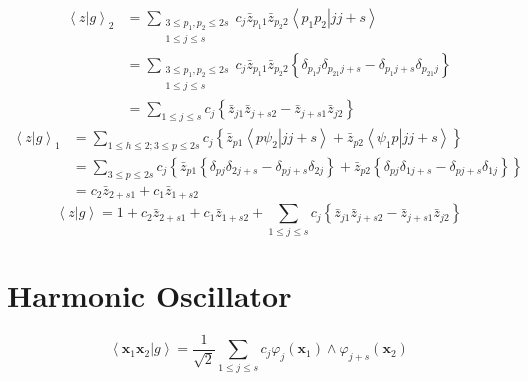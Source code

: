 \documentclass[aps,preprint]{revtex4}%
\begin{document}
\begin{align}
\left\langle \left.  z\right\vert g\right\rangle _{2} &  =%
{\displaystyle\sum\limits_{\substack{3\leq p_{1},p_{2}\leq2s\\1\leq j\leq s}}}
c_{j}\bar{z}_{p_{1}1}\bar{z}_{p_{2}2}\left\langle \left.  p_{1}p_{2}%
\right\vert jj+s\right\rangle \\
&  =%
{\displaystyle\sum\limits_{\substack{3\leq p_{1},p_{2}\leq2s\\1\leq j\leq s}}}
c_{j}\bar{z}_{p_{1}1}\bar{z}_{p_{2}2}\left\{  \delta_{p_{1}j}\delta
_{p_{21}j+s}-\delta_{p_{1}j+s}\delta_{p_{21}j}\right\}  \\
&  =%
{\displaystyle\sum\limits_{1\leq j\leq s}}
c_{j}\left\{  \bar{z}_{j1}\bar{z}_{j+s2}-\bar{z}_{j+s1}\bar{z}_{j2}\right\}
\end{align}%
\begin{align}
\left\langle \left.  z\right\vert g\right\rangle _{1}  & =%
{\displaystyle\sum\limits_{1\leq h\leq2;3\leq p\leq2s}}
c_{j}\left\{  \bar{z}_{p1}\left\langle \left.  p\psi_{2}\right\vert
jj+s\right\rangle +\bar{z}_{p2}\left\langle \left.  \psi_{1}p\right\vert
jj+s\right\rangle \right\}  \\
& =%
{\displaystyle\sum\limits_{3\leq p\leq2s}}
c_{j}\left\{  \bar{z}_{p1}\left\{  \delta_{pj}\delta_{2j+s}-\delta
_{pj+s}\delta_{2j}\right\}  +\bar{z}_{p2}\left\{  \delta_{pj}\delta
_{1j+s}-\delta_{pj+s}\delta_{1j}\right\}  \right\}  \\
& =c_{2}\bar{z}_{2+s1}+c_{1}\bar{z}_{1+s2}%
\end{align}%
\begin{equation}
\left\langle \left.  z\right\vert g\right\rangle =1+c_{2}\bar{z}_{2+s1}%
+c_{1}\bar{z}_{1+s2}+%
{\displaystyle\sum\limits_{1\leq j\leq s}}
c_{j}\left\{  \bar{z}_{j1}\bar{z}_{j+s2}-\bar{z}_{j+s1}\bar{z}_{j2}\right\}
\end{equation}


\section{Harmonic Oscillator}%

\begin{equation}
\left\langle \left.  \mathbf{x}_{1}\mathbf{x}_{2}\right\vert g\right\rangle
=\frac{1}{\sqrt{2}}\sum_{1\leq j\leq s}c_{j}\varphi_{j}\left(  \mathbf{x}%
_{1}\right)  \wedge\varphi_{j+s}\left(  \mathbf{x}_{2}\right)
\end{equation}
\end{document}

